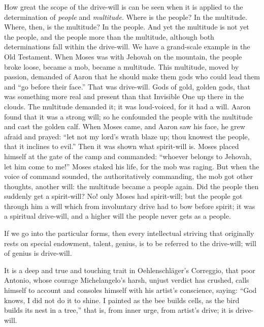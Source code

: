 \documentclass[12pt,a4paper,openany]{book}
\newcommand{\opage}[1]{\marginnote{\footnotesize\textit{[#1]}}}
\begin{document}
How great the scope of the drive-will is can be seen when it is
applied to the determination of \emph{people} and \emph{multitude}. Where
is the people? In the multitude. Where, then, is the multitude? In %
the people.
And yet the multitude is not yet the people, and the people more
than the multitude, although both determinations fall within
the drive-will. We have a grand-scale example in the Old
Testament. When Moses was with Jehovah on the mountain, the
people broke loose, became a mob, became a multitude. This multitude, moved
by passion, demanded of Aaron that he should
make them gods who could lead them and ``go before
their face.'' That was drive-will. Gods of gold, golden gods,
that was something more real and present
\setcounter{footnote}{0}%
\opage{18}than that Invisible One up there in the clouds. The multitude demanded
it; it was loud-voiced, for it had a will. Aaron
found that it was a strong will; so he confounded the
people with the multitude and cast the golden calf. When Moses
came, and Aaron saw his face, he grew afraid and prayed:
``let not my lord's wrath blaze up; thou knowest the people, that
it inclines to evil.'' Then it was shown what spirit-will
is. Moses placed himself at the gate of the camp and commanded: ``whoever
belongs to Jehovah, let him come to me!'' Moses staked
his life, for the mob was raging. But when the voice of command
sounded, the authoritatively commanding, the mob got other thoughts,
another will: the multitude became a people again. Did the people
then suddenly get a spirit-will? No! only Moses had spirit-will;
but the people got through him a will which from involuntary
drive had to bow before spirit; it was a spiritual drive-will,
and a higher will the people never gets as a people.

If we go into the particular forms, then every
intellectual striving that originally rests on special endowment,
talent, genius, is to be referred to the drive-will; will of genius is
drive-will.

It is a deep and true and touching trait in Oehlenschläger's
Correggio, that poor Antonio, whose courage
Michelangelo's harsh, unjust verdict has crushed, calls
himself to account and consoles himself with his artist's conscience,
saying: ``God knows, I did not do it
to shine. I painted as the bee builds cells, as
the bird builds its nest in a tree,'' that is, from inner urge,
from artist's drive; it is drive-will.
\end{document}
